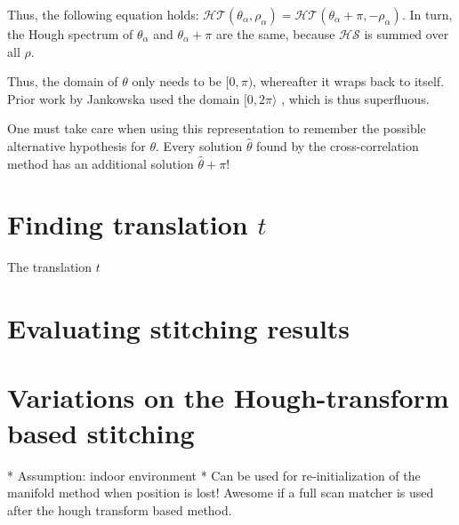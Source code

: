 Thus, the following equation holds: $\mathcal{HT}(\theta_\alpha, \rho_\alpha) = \mathcal{HT}(\theta_\alpha + \pi, -\rho_\alpha)$. In turn, the Hough spectrum of $\theta_\alpha$ and $\theta_\alpha + \pi$ are the same, because $\mathcal{HS}$ is summed over all $\rho$. 

Thus, the domain of $\theta$ only needs to be $[0, \pi)$, whereafter it wraps back to itself. Prior work by Jankowska used the domain $[0, 2\pi\rangle$ \cite{jankowska}, which is thus superfluous.

One must take care when using this representation to remember the possible alternative hypothesis for $\theta$. Every solution $\hat\theta$ found by the cross-correlation method has an additional solution $\hat\theta + \pi$!

\section{Finding translation $t$}
The translation $t$ 


\section{Evaluating stitching results}

\section{Variations on the Hough-transform based stitching}



* Assumption: indoor environment
* Can be used for re-initialization of the manifold method when position is lost! Awesome if a full scan matcher is used after the hough transform based method.